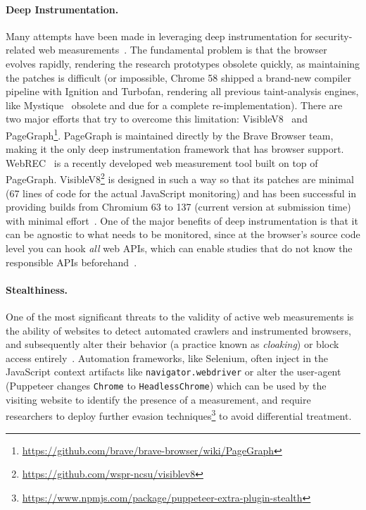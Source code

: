 \paragraph{Deep Instrumentation.} 
Many attempts have been made in leveraging deep instrumentation for security-related web measurements~\cite{neasbittWebCapsuleLightweightForensic2015,liJSgraphEnablingReconstruction2018, acarFPDetectiveDustingWeb2013, IncontextStoreIncontext1998, chenMystiqueUncoveringInformation2018}. The fundamental problem is that the browser evolves rapidly, rendering the research prototypes obsolete quickly, as maintaining the patches is difficult (or impossible, Chrome 58 shipped a brand-new compiler pipeline with Ignition and Turbofan, rendering all previous taint-analysis engines, like Mystique~\cite{chenMystiqueUncoveringInformation2018} obsolete and due for a complete re-implementation). There are two major efforts that try to overcome this limitation: VisibleV8~\cite{jueckstockVisibleV8InbrowserMonitoring2019} and PageGraph\footnote{\url{https://github.com/brave/brave-browser/wiki/PageGraph}}. PageGraph is maintained directly by the Brave Browser team, making it the only deep instrumentation framework that has browser support. WebREC~\cite{hantkeWebExecutionBundles2025} is a recently developed web measurement tool  built on top of PageGraph. VisibleV8\footnote{\url{https://github.com/wspr-ncsu/visiblev8}} is designed in such a way so that its patches are minimal (67 lines of code for the actual JavaScript monitoring) and has been successful in providing builds from Chromium 63 to 137 (current version at submission time) with minimal effort~\cite{jueckstockVisibleV8InbrowserMonitoring2019}. One of the major benefits of deep instrumentation is that it can be agnostic to what needs to be monitored, since at the browser's source code level you can hook \textit{all} web APIs, which can enable studies that do not know the responsible APIs beforehand~\cite{suAutomaticDiscoveryEmerging2023}.

\paragraph{Stealthiness.}
One of the most significant threats to the validity of active web measurements is the ability of websites to detect automated crawlers and instrumented browsers, and subsequently alter their behavior (a practice known as \textit{cloaking}) or block access entirely~\cite{invernizzi2016cloak}. Automation frameworks, like Selenium, often inject in the JavaScript context artifacts like \texttt{navigator.webdriver} or alter the user-agent (Puppeteer changes \texttt{Chrome} to \texttt{HeadlessChrome}) which can be used by the visiting website to identify the presence of a measurement, and require researchers to deploy further evasion techniques\footnote{\url{https://www.npmjs.com/package/puppeteer-extra-plugin-stealth}} to avoid differential treatment.

